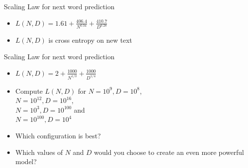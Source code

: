 
\begin{vbframe}{Scaling Law for next word prediction}

\vfill

\begin{itemize}
    \item $L(N,D) = 1.61 + \frac{406.4}{N^{0.34}} + \frac{410.7}{D^{0.28}}$
    \item $L(N,D)$ is cross entropy on new text
\end{itemize}

\vfill

\end{vbframe}

\begin{vbframe}{Scaling Law for next word prediction}

\vfill

\begin{itemize}
    \item $L(N,D) = 2 + \frac{1000}{N^{1/3}} + \frac{1000}{D^{1/4}}$
    \item \ques Compute $L(N,D)$ for
    $N=10^9,D=10^8$,\\
    $N=10^{12},D=10^{16}$,\\
    $N=10^3,D=10^{100}$ and\\
    $N=10^{100},D=10^4$
    \item \ques Which configuration is best?
    \item \ques Which values of $N$ and $D$ would you choose
    to create an even more powerful model?
\end{itemize}

\vfill

\end{vbframe}


